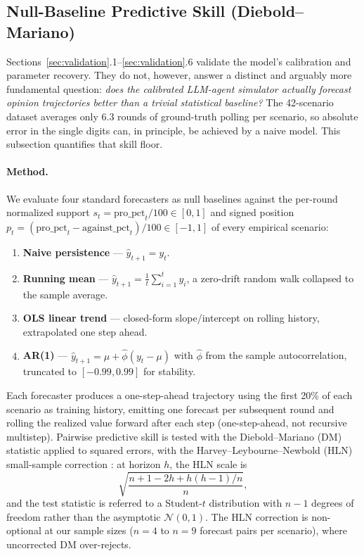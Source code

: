 \documentclass[12pt]{article}
\begin{document}
\subsection{Null-Baseline Predictive Skill (Diebold--Mariano)}
\label{sec:dm_benchmark}

Sections~\ref{sec:validation}.1--\ref{sec:validation}.6 validate the model's calibration and parameter recovery. They do not, however, answer a distinct and arguably more fundamental question: \emph{does the calibrated LLM-agent simulator actually forecast opinion trajectories better than a trivial statistical baseline?} The 42-scenario dataset averages only 6.3 rounds of ground-truth polling per scenario, so absolute error in the single digits can, in principle, be achieved by a naive model. This subsection quantifies that skill floor.

\paragraph{Method.} We evaluate four standard forecasters as null baselines against the per-round normalized support $s_t = \text{pro\_pct}_t / 100 \in [0, 1]$ and signed position $p_t = (\text{pro\_pct}_t - \text{against\_pct}_t)/100 \in [-1, 1]$ of every empirical scenario:

\begin{enumerate}
    \item \textbf{Naive persistence} --- $\hat{y}_{t+1} = y_t$.
    \item \textbf{Running mean} --- $\hat{y}_{t+1} = \tfrac{1}{t} \sum_{i=1}^{t} y_i$, a zero-drift random walk collapsed to the sample average.
    \item \textbf{OLS linear trend} --- closed-form slope/intercept on rolling history, extrapolated one step ahead.
    \item \textbf{AR(1)} --- $\hat{y}_{t+1} = \mu + \hat{\phi}(y_t - \mu)$ with $\hat\phi$ from the sample autocorrelation, truncated to $[-0.99, 0.99]$ for stability.
\end{enumerate}

Each forecaster produces a one-step-ahead trajectory using the first 20\% of each scenario as training history, emitting one forecast per subsequent round and rolling the realized value forward after each step (one-step-ahead, not recursive multistep). Pairwise predictive skill is tested with the Diebold--Mariano (DM) statistic \citep{diebold1995} applied to squared errors, with the Harvey--Leybourne--Newbold (HLN) small-sample correction \citep{harvey1997}: at horizon $h$, the HLN scale is
\[
\sqrt{\frac{n + 1 - 2h + h(h-1)/n}{n}},
\]
and the test statistic is referred to a Student-$t$ distribution with $n - 1$ degrees of freedom rather than the asymptotic $\mathcal{N}(0, 1)$. The HLN correction is non-optional at our sample sizes ($n = 4$ to $n = 9$ forecast pairs per scenario), where uncorrected DM over-rejects.
\end{document}

